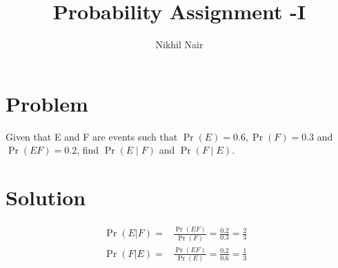 \documentclass[journal,12pt,twocolumn]{IEEEtran}
\title{\mytitle}
\title{
Probability Assignment -I
}
\author{Nikhil Nair}
\providecommand{\pr}[1]{\ensuremath{\Pr\left(#1\right)}}
\begin{document}
\maketitle
\bigskip


\section{\textbf{Problem }}
Given that E and F are events such that $\pr{E}=0.6, \pr{F}=0.3$ and $\pr{E F}=0.2$, find $\pr{E \mid F}$ and $\pr{F \mid E}$.



\section{\textbf{Solution }}

\begin{align}
\pr{E|F}=&\frac{\pr{E  F}}{\pr{F}}=\frac{0.2}{0.3}=\frac{2}{3}&  
\\
\pr{F|E}=&\frac{\pr{E  F}}{\pr{E}}=\frac{0.2}{0.6}=\frac{1}{3}&  
\end{align}
\end{document}
